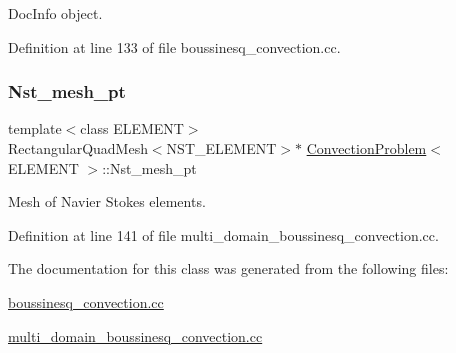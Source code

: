Doc\+Info object. 



Definition at line 133 of file boussinesq\+\_\+convection.\+cc.

\mbox{\label{classConvectionProblem_a3bf695d1bd7b59b97aee57cfe66e4bcb}} 
\subsubsection{\texorpdfstring{Nst\+\_\+mesh\+\_\+pt}{Nst\_mesh\_pt}}
{\footnotesize\ttfamily template$<$class E\+L\+E\+M\+E\+NT$>$ \\
Rectangular\+Quad\+Mesh$<$N\+S\+T\+\_\+\+E\+L\+E\+M\+E\+NT$>$$\ast$ \hyperlink{classConvectionProblem}{Convection\+Problem}$<$ E\+L\+E\+M\+E\+NT $>$\+::Nst\+\_\+mesh\+\_\+pt\hspace{0.3cm}{\ttfamily [protected]}}



Mesh of Navier Stokes elements. 



Definition at line 141 of file multi\+\_\+domain\+\_\+boussinesq\+\_\+convection.\+cc.



The documentation for this class was generated from the following files\+:\begin{DoxyCompactItemize}
\item 
\hyperlink{boussinesq__convection_8cc}{boussinesq\+\_\+convection.\+cc}\item 
\hyperlink{multi__domain__boussinesq__convection_8cc}{multi\+\_\+domain\+\_\+boussinesq\+\_\+convection.\+cc}\end{DoxyCompactItemize}
